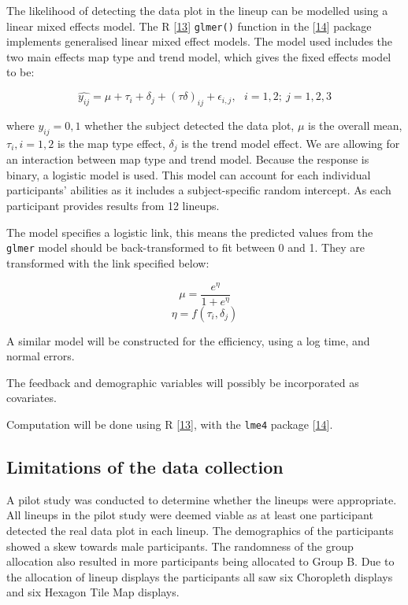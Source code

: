 \documentclass[conference,final,]{IEEEtran}
\begin{document}
The likelihood of detecting the data plot in the lineup can be modelled using a linear mixed effects model.
The R {[}\protect\hyperlink{ref-RCore}{13}{]} \texttt{glmer()} function in the {[}\protect\hyperlink{ref-lme4}{14}{]} package implements generalised linear mixed effect models. The model used includes the two main effects map type and trend model, which gives the fixed effects model to be:

\[\widehat{y_{ij}} = \mu + \tau_i + \delta_j + (\tau\delta)_{ij} + \epsilon_{i,j}, ~~~ i=1,2; ~j=1,2,3\]

where \(y_{ij} = 0, 1\) whether the subject detected the data plot, \(\mu\) is the overall mean, \(\tau_i, i=1,2\) is the map type effect, \(\delta_j\) is the trend model effect. We are allowing for an interaction between map type and trend model. Because the response is binary, a logistic model is used. This model can account for each individual participants' abilities as it includes a subject-specific random intercept. As each participant provides results from 12 lineups.

The model specifies a logistic link, this means the predicted values from the \texttt{glmer} model should be back-transformed to fit between 0 and 1. They are transformed with the link specified below:

\[\mu = \frac{e^{\eta}}{1 + e^{\eta}}\]
\[\eta = f(\tau_i,\delta_j)\]

A similar model will be constructed for the efficiency, using a log time, and normal errors.

The feedback and demographic variables will possibly be incorporated as covariates.

Computation will be done using R {[}\protect\hyperlink{ref-RCore}{13}{]}, with the \texttt{lme4} package {[}\protect\hyperlink{ref-lme4}{14}{]}.

\hypertarget{limitations-of-the-data-collection}{%
\subsection{Limitations of the data collection}\label{limitations-of-the-data-collection}}

A pilot study was conducted to determine whether the lineups were appropriate. All lineups in the pilot study were deemed viable as at least one participant detected the real data plot in each lineup.
The demographics of the participants showed a skew towards male participants.
The randomness of the group allocation also resulted in more participants being allocated to Group B. Due to the allocation of lineup displays the participants all saw six Choropleth displays and six Hexagon Tile Map displays.
\end{document}
